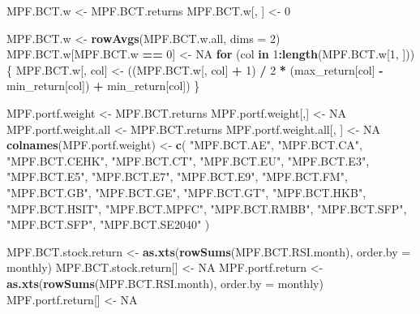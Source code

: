 \documentclass[]{article}
\newenvironment{Shaded}{\begin{snugshade}}{\end{snugshade}}
\newcommand{\ControlFlowTok}[1]{\textcolor[rgb]{0.13,0.29,0.53}{\textbf{#1}}}
\newcommand{\DataTypeTok}[1]{\textcolor[rgb]{0.13,0.29,0.53}{#1}}
\newcommand{\DecValTok}[1]{\textcolor[rgb]{0.00,0.00,0.81}{#1}}
\newcommand{\KeywordTok}[1]{\textcolor[rgb]{0.13,0.29,0.53}{\textbf{#1}}}
\newcommand{\NormalTok}[1]{#1}
\newcommand{\OperatorTok}[1]{\textcolor[rgb]{0.81,0.36,0.00}{\textbf{#1}}}
\newcommand{\OtherTok}[1]{\textcolor[rgb]{0.56,0.35,0.01}{#1}}
\newcommand{\StringTok}[1]{\textcolor[rgb]{0.31,0.60,0.02}{#1}}
\begin{document}
\begin{Shaded}
\begin{Highlighting}[]
\NormalTok{MPF.BCT.w <-}\StringTok{ }\NormalTok{MPF.BCT.returns}
\NormalTok{MPF.BCT.w[, ] <-}\StringTok{ }\DecValTok{0}

\NormalTok{MPF.BCT.w <-}\StringTok{ }\KeywordTok{rowAvgs}\NormalTok{(MPF.BCT.w.all, }\DataTypeTok{dims =} \DecValTok{2}\NormalTok{)}
\NormalTok{MPF.BCT.w[MPF.BCT.w }\OperatorTok{==}\StringTok{ }\DecValTok{0}\NormalTok{] <-}\StringTok{ }\OtherTok{NA}
\ControlFlowTok{for}\NormalTok{ (col }\ControlFlowTok{in} \DecValTok{1}\OperatorTok{:}\KeywordTok{length}\NormalTok{(MPF.BCT.w[}\DecValTok{1}\NormalTok{, ])) \{}
\NormalTok{  MPF.BCT.w[, col] <-}
\StringTok{    }\NormalTok{((MPF.BCT.w[, col] }\OperatorTok{+}\StringTok{ }\DecValTok{1}\NormalTok{) }\OperatorTok{/}\StringTok{ }\DecValTok{2} \OperatorTok{*}\StringTok{ }\NormalTok{(max_return[col] }\OperatorTok{-}\StringTok{ }\NormalTok{min_return[col]) }\OperatorTok{+}\StringTok{ }\NormalTok{min_return[col])}
\NormalTok{\}}



\NormalTok{MPF.portf.weight <-}\StringTok{ }\NormalTok{MPF.BCT.returns}
\NormalTok{MPF.portf.weight[,] <-}\StringTok{ }\OtherTok{NA}
\NormalTok{MPF.portf.weight.all <-}\StringTok{ }\NormalTok{MPF.BCT.returns}
\NormalTok{MPF.portf.weight.all[, ] <-}\StringTok{ }\OtherTok{NA}
\KeywordTok{colnames}\NormalTok{(MPF.portf.weight) <-}
\StringTok{  }\KeywordTok{c}\NormalTok{(}
    \StringTok{"MPF.BCT.AE"}\NormalTok{,}
    \StringTok{"MPF.BCT.CA"}\NormalTok{,}
    \StringTok{"MPF.BCT.CEHK"}\NormalTok{,}
    \StringTok{"MPF.BCT.CT"}\NormalTok{,}
    \StringTok{"MPF.BCT.EU"}\NormalTok{,}
    \StringTok{"MPF.BCT.E3"}\NormalTok{,}
    \StringTok{"MPF.BCT.E5"}\NormalTok{,}
    \StringTok{"MPF.BCT.E7"}\NormalTok{,}
    \StringTok{"MPF.BCT.E9"}\NormalTok{,}
    \StringTok{"MPF.BCT.FM"}\NormalTok{,}
    \StringTok{"MPF.BCT.GB"}\NormalTok{,}
    \StringTok{"MPF.BCT.GE"}\NormalTok{,}
    \StringTok{"MPF.BCT.GT"}\NormalTok{,}
    \StringTok{"MPF.BCT.HKB"}\NormalTok{,}
    \StringTok{"MPF.BCT.HSIT"}\NormalTok{,}
    \StringTok{"MPF.BCT.MPFC"}\NormalTok{,}
    \StringTok{"MPF.BCT.RMBB"}\NormalTok{,}
    \StringTok{"MPF.BCT.SFP"}\NormalTok{,}
    \StringTok{"MPF.BCT.SFP"}\NormalTok{,}
    \StringTok{"MPF.BCT.SE2040"}
\NormalTok{  )}

\NormalTok{MPF.BCT.stock.return <-}
\StringTok{  }\KeywordTok{as.xts}\NormalTok{(}\KeywordTok{rowSums}\NormalTok{(MPF.BCT.RSI.month), }\DataTypeTok{order.by =}\NormalTok{ monthly)}
\NormalTok{MPF.BCT.stock.return[] <-}\StringTok{ }\OtherTok{NA}
\NormalTok{MPF.portf.return <-}
\StringTok{  }\KeywordTok{as.xts}\NormalTok{(}\KeywordTok{rowSums}\NormalTok{(MPF.BCT.RSI.month), }\DataTypeTok{order.by =}\NormalTok{ monthly)}
\NormalTok{MPF.portf.return[] <-}\StringTok{ }\OtherTok{NA}



\end{Highlighting}
\end{Shaded}
\end{document}
